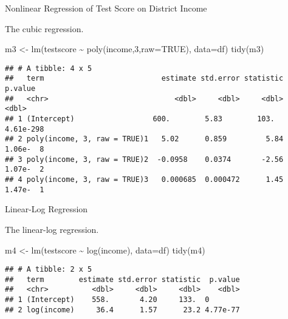 \documentclass[
  10pt,
  ignorenonframetext,
  t, svgnames, handout]{beamer}
\newenvironment{Shaded}{\begin{snugshade}}{\end{snugshade}}
\newcommand{\AttributeTok}[1]{\textcolor[rgb]{0.77,0.63,0.00}{#1}}
\newcommand{\ConstantTok}[1]{\textcolor[rgb]{0.00,0.00,0.00}{#1}}
\newcommand{\DecValTok}[1]{\textcolor[rgb]{0.00,0.00,0.81}{#1}}
\newcommand{\FunctionTok}[1]{\textcolor[rgb]{0.00,0.00,0.00}{#1}}
\newcommand{\NormalTok}[1]{#1}
\newcommand{\OtherTok}[1]{\textcolor[rgb]{0.56,0.35,0.01}{#1}}
\newcommand{\SpecialCharTok}[1]{\textcolor[rgb]{0.00,0.00,0.00}{#1}}
\begin{document}
\begin{frame}[fragile]{Nonlinear Regression of Test Score on District
Income}
\protect\hypertarget{nonlinear-regression-of-test-score-on-district-income-1}{}
\begin{block}{The cubic regression.}
\protect\hypertarget{the-cubic-regression.}{}
\scriptsize

\begin{Shaded}
\begin{Highlighting}[]
\NormalTok{m3 }\OtherTok{\textless{}{-}} \FunctionTok{lm}\NormalTok{(testscore }\SpecialCharTok{\textasciitilde{}} \FunctionTok{poly}\NormalTok{(income,}\DecValTok{3}\NormalTok{,}\AttributeTok{raw=}\ConstantTok{TRUE}\NormalTok{), }\AttributeTok{data=}\NormalTok{df)}
\FunctionTok{tidy}\NormalTok{(m3)}
\end{Highlighting}
\end{Shaded}

\begin{verbatim}
## # A tibble: 4 x 5
##   term                           estimate std.error statistic   p.value
##   <chr>                             <dbl>     <dbl>     <dbl>     <dbl>
## 1 (Intercept)                  600.        5.83        103.   4.61e-298
## 2 poly(income, 3, raw = TRUE)1   5.02      0.859         5.84 1.06e-  8
## 3 poly(income, 3, raw = TRUE)2  -0.0958    0.0374       -2.56 1.07e-  2
## 4 poly(income, 3, raw = TRUE)3   0.000685  0.000472      1.45 1.47e-  1
\end{verbatim}

\normalsize
\end{block}
\end{frame}

\begin{frame}[fragile]{Linear-Log Regression}
\protect\hypertarget{linear-log-regression}{}
\begin{block}{The linear-log regression.}
\protect\hypertarget{the-linear-log-regression.}{}
\scriptsize

\begin{Shaded}
\begin{Highlighting}[]
\NormalTok{m4 }\OtherTok{\textless{}{-}} \FunctionTok{lm}\NormalTok{(testscore }\SpecialCharTok{\textasciitilde{}} \FunctionTok{log}\NormalTok{(income), }\AttributeTok{data=}\NormalTok{df)}
\FunctionTok{tidy}\NormalTok{(m4)}
\end{Highlighting}
\end{Shaded}

\begin{verbatim}
## # A tibble: 2 x 5
##   term        estimate std.error statistic  p.value
##   <chr>          <dbl>     <dbl>     <dbl>    <dbl>
## 1 (Intercept)    558.       4.20     133.  0       
## 2 log(income)     36.4      1.57      23.2 4.77e-77
\end{verbatim}

\normalsize
\end{block}
\end{frame}
\end{document}
